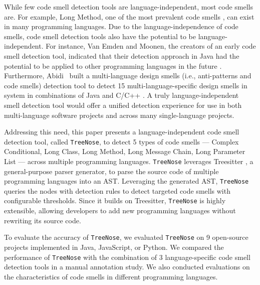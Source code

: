 While few code smell detection tools are language-independent, most code smells
are. For example, Long Method, one of the most prevalent code smells
\cite{developersCare}, can exist in many programming languages. Due to the
language-independence of code smells, code smell detection tools also have the
potential to be language-independent. For instance, Van Emden and Moonen, the
creators of an early code smell detection tool, indicated that their detection
approach in Java had the potential to be applied to other programming languages
in the future \cite{1173068}. Furthermore, Abidi~\etal{} built a multi-language
design smells (i.e., anti-patterns and code smells) detection tool to detect 15
multi-language-specific design smells in system in combinations of Java and
C/C++ \cite{MultiLanguageCodeSmells,Fault-Prone}. A truly language-independent
smell detection tool would offer a unified detection experience for use in both
multi-language software projects and across many single-language projects.


Addressing this need, this paper presents a language-independent code smell
detection tool, called \texttt{TreeNose}, to detect 5 types of code smells ---
Complex Conditional, Long Class, Long Method, Long Message Chain, Long Parameter
List --- across multiple programming languages. \texttt{TreeNose} leverages
Treesitter \cite{treeSitter}, a general-purpose parser generator, to parse the
source code of multiple programming languages into an AST. Leveraging the
generated AST, \texttt{TreeNose} queries the nodes with detection rules to
detect targeted code smells with configurable thresholds. Since it builds on
Treesitter, \texttt{TreeNose} is highly extensible, allowing developers to add
new programming languages without rewriting its source code.


To evaluate the accuracy of \texttt{TreeNose}, we evaluated \texttt{TreeNose} on
9 open-source projects implemented in Java, JavaScript, or Python. We compared
the performance of \texttt{TreeNose} with the combination of 3 language-specific
code smell detection tools in a manual annotation study. We also conducted
evaluations on the characteristics of code smells in different programming
languages.


